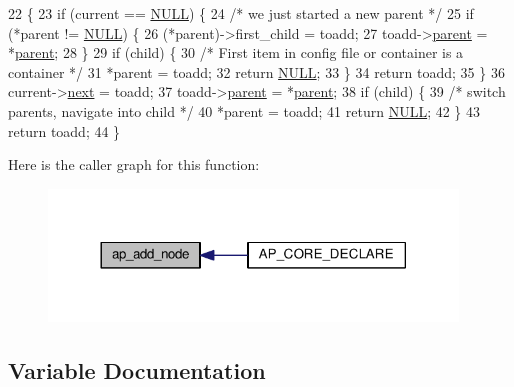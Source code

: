 \begin{DoxyCode}
22 \{
23     \textcolor{keywordflow}{if} (current == \hyperlink{pcre_8txt_ad7f989d16aa8ca809a36bc392c07fba1}{NULL}) \{
24         \textcolor{comment}{/* we just started a new parent */}
25         \textcolor{keywordflow}{if} (*parent != \hyperlink{pcre_8txt_ad7f989d16aa8ca809a36bc392c07fba1}{NULL}) \{
26             (*parent)->first\_child = toadd;
27             toadd->\hyperlink{structap__directive__t_a2269b52ef32da6ee5116fb559df38fc7}{parent} = *\hyperlink{group__apr__pools_ga3eb8c52002440da9a3eed11d54d08dd5}{parent};
28         \}
29         \textcolor{keywordflow}{if} (child) \{
30             \textcolor{comment}{/* First item in config file or container is a container */}
31             *parent = toadd;
32             \textcolor{keywordflow}{return} \hyperlink{pcre_8txt_ad7f989d16aa8ca809a36bc392c07fba1}{NULL};
33         \}
34         \textcolor{keywordflow}{return} toadd;
35     \}
36     current->\hyperlink{structap__directive__t_a0d106e8328ddc177654ff6770455f485}{next} = toadd;
37     toadd->\hyperlink{structap__directive__t_a2269b52ef32da6ee5116fb559df38fc7}{parent} = *\hyperlink{group__apr__pools_ga3eb8c52002440da9a3eed11d54d08dd5}{parent};
38     \textcolor{keywordflow}{if} (child) \{
39         \textcolor{comment}{/* switch parents, navigate into child */}
40         *parent = toadd;
41         \textcolor{keywordflow}{return} \hyperlink{pcre_8txt_ad7f989d16aa8ca809a36bc392c07fba1}{NULL};
42     \}
43     \textcolor{keywordflow}{return} toadd;
44 \}
\end{DoxyCode}


Here is the caller graph for this function\+:
\nopagebreak
\begin{figure}[H]
\begin{center}
\leavevmode
\includegraphics[width=308pt]{group__APACHE__CORE__CONFIG__TREE_ga0f93d976ae59015db6b7ce0365cbb4a2_icgraph}
\end{center}
\end{figure}




\subsection{Variable Documentation}
